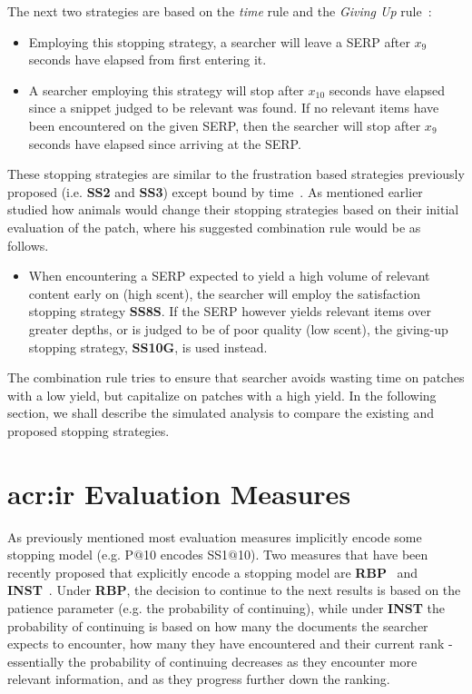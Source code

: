 The next two strategies are based on the \emph{time} rule and the \emph{Giving Up} rule~\cite{gibbs1958number_rule}:

\begin{itemize}
    \item[\blueboxbold{SS9}] Employing this stopping strategy, a searcher will leave a SERP after $x_9$ seconds have elapsed from first entering it.
\end{itemize}

\begin{itemize}
    \item[\blueboxbold{SS10}] A searcher employing this strategy will stop after $x_10$ seconds have elapsed since a snippet judged to be relevant was found. If no relevant items have been encountered on the given SERP, then the searcher will stop after $x_9$ seconds have elapsed since arriving at the SERP.
\end{itemize}

These stopping strategies are similar to the frustration based strategies previously proposed (i.e. \textbf{SS2} and \textbf{SS3}) except bound by time~\cite{gibbs1958number_rule}. As mentioned earlier ~\citet{mcnair1982gut_mvt} studied how animals would change their stopping strategies based on their initial evaluation  of the patch, where his suggested combination rule would be as follows.

\begin{itemize}
    \item[\blueboxbold{SS11}] When encountering a SERP expected to yield a high volume of relevant content early on (high scent), the searcher will employ the satisfaction stopping strategy \textbf{SS8S}. If the SERP however yields relevant items over greater depths, or is judged to be of poor quality (low scent), the giving-up stopping strategy, \textbf{SS10G}, is used instead.
\end{itemize}

The combination rule tries to ensure that searcher avoids wasting time on patches with a low yield, but capitalize on patches with a high yield. In the following section, we shall describe the simulated analysis to compare the existing and proposed stopping strategies.

\section{\gls{acr:ir} Evaluation Measures}
As previously mentioned most evaluation measures implicitly encode some stopping model (e.g. P$@$10 encodes SS1$@$10). Two measures that have been recently proposed that explicitly encode a stopping model are \textbf{RBP}~\cite{moffat2008rbp} and \textbf{INST}~\cite{bailey2015inst, moffat2015inst}. 
Under \textbf{RBP}, the decision to continue to the next results is based on the patience parameter (e.g. the probability of continuing), while under \textbf{INST} the probability of continuing is based on how many the documents the searcher expects to encounter, how many they have encountered and their current rank - essentially the probability of continuing decreases as they encounter more relevant information, and as they progress further down the ranking.

